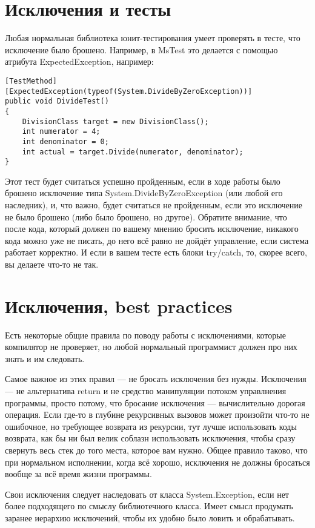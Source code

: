 \documentclass[a5paper]{article}
\begin{document}
\section{Исключения и тесты}

Любая нормальная библиотека юнит-тестирования умеет проверять в тесте, что исключение было брошено. Например, в MsTest это делается с помощью атрибута ExpectedException, например: 

\begin{verbatim}
[TestMethod]
[ExpectedException(typeof(System.DivideByZeroException))]
public void DivideTest()
{
    DivisionClass target = new DivisionClass();
    int numerator = 4;
    int denominator = 0;
    int actual = target.Divide(numerator, denominator);
}
\end{verbatim}

Этот тест будет считаться успешно пройденным, если в ходе работы было брошено исключение типа System.DivideByZeroException (или любой его наследник), и, что важно, будет считаться не пройденным, если это исключение не было брошено (либо было брошено, но другое). Обратите внимание, что после кода, который должен по вашему мнению бросить исключение, никакого кода можно уже не писать, до него всё равно не дойдёт управление, если система работает корректно. И если в вашем тесте есть блоки try/catch, то, скорее всего, вы делаете что-то не так.

\section{Исключения, best practices}

Есть некоторые общие правила по поводу работы с исключениями, которые компилятор не проверяет, но любой нормальный программист должен про них знать и им следовать.

Самое важное из этих правил --- не бросать исключения без нужды. Исключения --- не альтернатива return и не средство манипуляции потоком управлнения программы, просто потому, что бросание исключения --- вычислительно дорогая операция. Если где-то в глубине рекурсивных вызовов может произойти что-то не ошибочное, но требующее возврата из рекурсии, тут лучше использовать коды возврата, как бы ни был велик соблазн использовать исключения, чтобы сразу свернуть весь стек до того места, которое вам нужно. Общее правило таково, что при нормальном исполнении, когда всё хорошо, исключения не должны бросаться вообще за всё время жизни программы.

Свои исключения следует наследовать от класса System.Exception, если нет более подходящего по смыслу библиотечного класса. Имеет смысл продумать заранее иерархию исключений, чтобы их удобно было ловить и обрабатывать.
\end{document}
